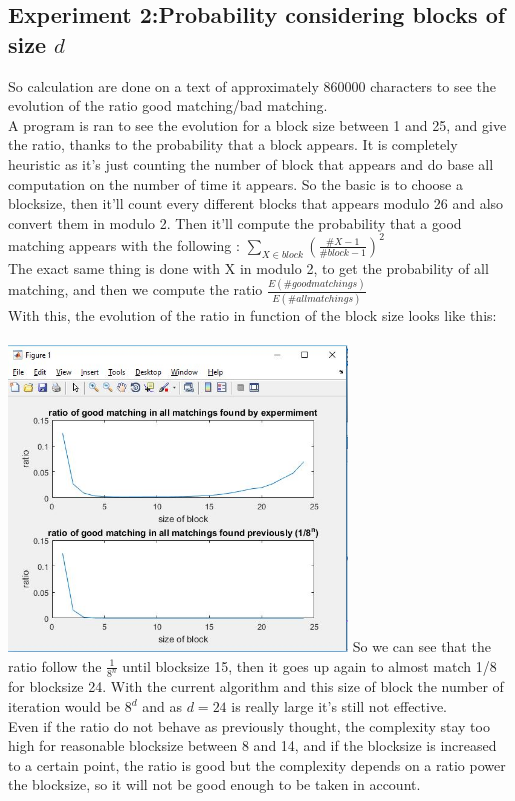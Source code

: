 \documentclass{article}
\begin{document}
\subsection*{Experiment 2:Probability considering blocks of size $d$}
So calculation are done on a text of approximately $860000$ characters to see the evolution of the ratio good matching/bad matching.\\
A program is ran to see the evolution for a block size between 1 and 25, and give the ratio, thanks to the probability that a block appears. It is completely heuristic as it's just counting the number of block that appears and do base all computation on the number of time it appears.
So the basic is to choose a blocksize, then it'll count every different blocks that appears modulo 26 and also convert them in modulo 2.
Then it'll compute the probability that a good matching appears with the following : $\sum_{X \in block}({\frac{\#X -1}{\#block -1}})^2 $\\
The exact same thing is done with X in modulo 2, to get the probability of all matching, and then we compute the ratio $\frac{E(\# good matchings)}{E(\# all matchings)}$\\
With this, the evolution of the ratio in function of the block size looks like this:\\
\\
\includegraphics[width=90mm]{ratio.jpg}
So we can see that the ratio follow the $\frac{1}{8^n}$ until blocksize 15, then it goes up again to almost match 1/8 for blocksize 24. With the current algorithm and this size of block the number of iteration would be $8^d$ and as $d = 24$ is really large it's still not effective.\\
Even if the ratio do not behave as previously thought, the complexity stay too high for reasonable blocksize between 8 and 14, and if the blocksize is increased to a certain point, the ratio is good but the complexity depends on a ratio power the blocksize, so it will not be good enough to be taken in account.
\end{document}
